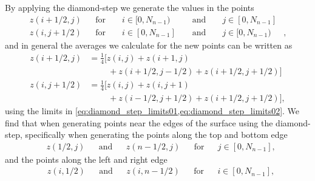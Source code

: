 By applying the diamond-step we generate the values in the points
\begin{align}
    z(i+1/2, j) & &\text{for } & &i\in [0,N_{n-1}) & &\text{ and } & &j\in [0,N_{n-1}]& \label{eq:diamond_step_limits01} \\
    z(i, j+1/2) & &\text{for } & &i\in [0,N_{n-1}] & &\text{ and } & &j\in [0,N_{n-1})&, \label{eq:diamond_step_limits02}
\end{align}
and in general the averages we calculate for the new points can be written as
\begin{align}
    z(i+1/2, j) 
    &= 
    \frac{1}{4}\Big[
        z(i, j) + z(i+1, j) \nonumber\\
        &\phantom{=\Big[}~~~%
            + z(i+1/2, j-1/2) + z(i+1/2, j+1/2)
    \Big]
    \label{eq:diamond_step01}\\
    z(i, j+1/2) 
    &= 
    \frac{1}{4}\Big[
        z(i,j) + z(i, j+1) \nonumber\\
        &\phantom{=\Big[}~~~%
            + z(i-1/2, j+1/2) + z(i+1/2, j+1/2)
    \Big],
    \label{eq:diamond_step02}
\end{align}
using the limits in \cref{eq:diamond_step_limits01,eq:diamond_step_limits02}. We find that when generating points near the edges of the surface using the diamond-step, specifically when generating the points along the top and bottom edge%
\begin{align*} %
    &z(1/2, j) & &\text{and} & &z(n - 1/2, j) & &\text{for} & &j \in [0, N_{n-1}],
\end{align*}
and the points along the left and right edge %
\begin{align*}
    &z(i, 1/2) & &\text{and} & &z(i, n - 1/2) & &\text{for} & &i \in [0, N_{n-1}],
\end{align*}
